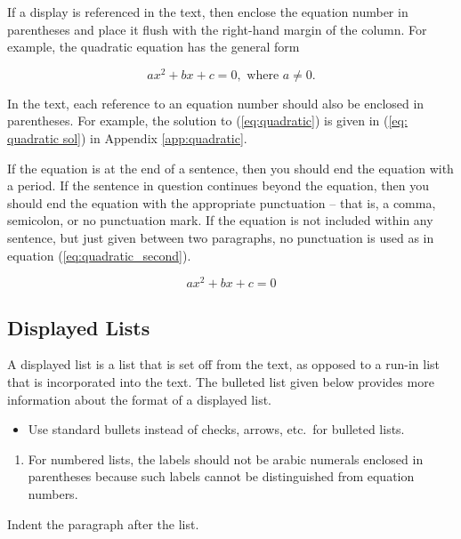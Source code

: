 \documentclass{wscpaperproc}
\theoremstyle{wsc}
\begin{document}
If a display is referenced in the text, then enclose the equation number in parentheses and place it flush with the right-hand margin of the
column. For example, the quadratic equation has the general form

\begin{equation} \label{eq:quadratic}
ax^2 + bx + c = 0, \mbox{ where } a \ne 0.
\end{equation}

In the text, each reference to an equation number should also be enclosed in parentheses. For example, the solution to (\ref{eq:quadratic}) is given in (\ref{eq: quadratic sol}) in Appendix \ref{app:quadratic}.

If the equation is at the end of a sentence, then you should end the equation with a period. If the sentence in question continues beyond the equation, then you should end the equation with the appropriate punctuation -- that is, a comma, semicolon, or no punctuation mark. If the equation is not included within any sentence, but just given between two paragraphs, no punctuation is used as in equation (\ref{eq:quadratic_second}).

\begin{equation} \label{eq:quadratic_second}
ax^2 + bx + c = 0
\end{equation}

\subsection{Displayed Lists}
A displayed list is a list that is set off from the text, as opposed to a run-in list that is incorporated into the text. The bulleted list given below provides more information about the format of a displayed list.

\begin{itemize}
	\item Use standard bullets instead of checks, arrows, etc.\ for bulleted lists.
\end{itemize}
\begin{enumerate}
	\item For numbered lists, the labels should not be arabic numerals enclosed in parentheses because such labels cannot be distinguished from equation numbers.
\end{enumerate}

Indent the paragraph after the list.
\end{document}

